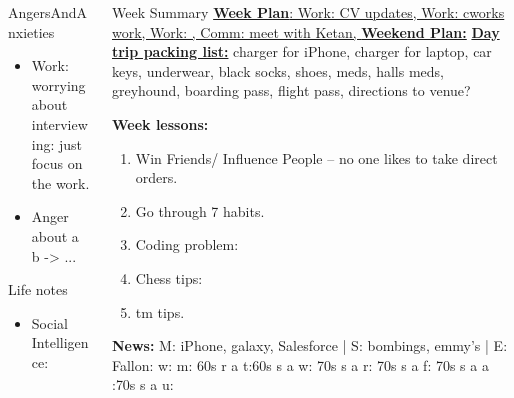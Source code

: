 \documentclass[serif, mathserif, final]{beamer}
\begin{document}
\begin{frame}
\begin{columns}
\begin{column}{0.25\linewidth}
\begin{block}{AngersAndAnxieties}
\begin{itemize}
          \item \tiny Work: worrying about interviewing: just
          focus on the work. 
          \item \tiny Anger about a b  -> ...
        \end{itemize}
      \end{block}
      \begin{block}{Life notes}
        \begin{itemize}
        \tiny \item \tiny Social Intelligence: 
        \end{itemize}
      \end{block}
\end{column}

\begin{column}{0.5\linewidth} 
  \begin{block}{Week Summary} 
    {\tiny \underline{\textbf{Week Plan}:  Work: CV updates, Work:
        cworks work, Work:  , Comm: meet with Ketan, } \tiny }
    {\tiny \underline{\textbf{Weekend Plan:}}}
    {\underline{\bf Day trip packing list:} charger for iPhone,
      charger for laptop, car keys, underwear, black socks, shoes, meds, halls
    meds, greyhound, boarding pass, flight pass, directions to venue?}

    {\tiny {\bf Week lessons:}}
    \begin{enumerate}
      \tiny \item \tiny Win Friends/ Influence People – no one
          likes to take direct orders.
        \item \tiny Go through 7 habits.
        \item \tiny Coding problem: 
        \item \tiny Chess tips: 
        \item \tiny tm tips.
    \end{enumerate}

    {{\tiny \bf News:} M: iPhone, galaxy, Salesforce | S:
      bombings, emmy's | E: Fallon:  w: {m: {60s r a}}  t:{60s s a}
      {w: {70s s a}} {r: {70s s a}} {f: {70s s a   } } {a :{70s
          s a} }  {u: {  }  } }
  \end{block} 


\end{column}
\end{columns}
\end{frame}
\end{document}
